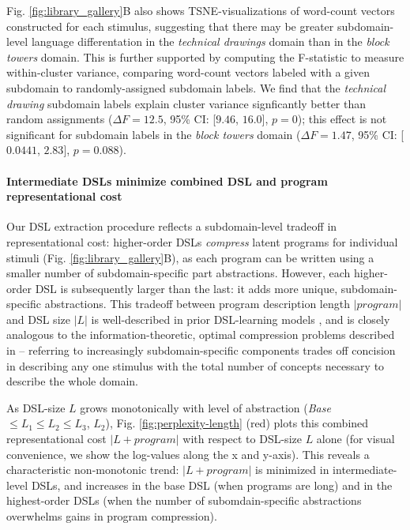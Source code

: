 \documentclass[10pt,letterpaper]{article}
\begin{document}
Fig. \ref{fig:library_gallery}B also shows TSNE-visualizations of word-count vectors constructed for each stimulus, suggesting that there may be greater subdomain-level language differentation in the \textit{technical drawings} domain than in the \textit{block towers} domain. This is further supported by computing the F-statistic to measure within-cluster variance, comparing word-count vectors labeled with a given subdomain to randomly-assigned subdomain labels. We find that the \textit{technical drawing} subdomain labels explain cluster variance signficantly better than random assignments ($\Delta F = 12.5$, 95\% CI: [$9.46$, $16.0$], $p=0$); this effect is not significant for subdomain labels in the \textit{block towers} domain ($\Delta F = 1.47$, 95\% CI: [$0.0441$, $2.83$], $p=0.088$).

\paragraph{Intermediate DSLs minimize combined DSL and program representational cost} Our DSL extraction procedure reflects a subdomain-level tradeoff in representational cost: higher-order DSLs \textit{compress} latent programs for individual stimuli (Fig. \ref{fig:library_gallery}B), as each program can be written using a smaller number of subdomain-specific part abstractions. However, each higher-order DSL is subsequently larger than the last: it adds more unique, subdomain-specific abstractions.
This tradeoff between program description length $|program|$ and DSL size $|L|$ is well-described in prior DSL-learning models , and is closely analogous to the information-theoretic, optimal compression problems described in  -- referring to increasingly subdomain-specific components trades off concision in describing any one stimulus with the total number of concepts necessary to describe the whole domain. 

As DSL-size $L$ grows monotonically with level of abstraction (\textit{Base} $\leq L_1 \leq L_2 \leq L_3$, $L_2$), Fig. \ref{fig:perplexity-length} (red) plots this combined representational cost $|L + program|$ with respect to DSL-size $L$ alone (for visual convenience, we show the log-values along the x and y-axis). This reveals a characteristic non-monotonic trend: $|L + program|$ is minimized in intermediate-level DSLs, and increases in the base DSL (when programs are long) and in the highest-order DSLs (when the number of subomdain-specific abstractions overwhelms gains in program compression).
\end{document}
